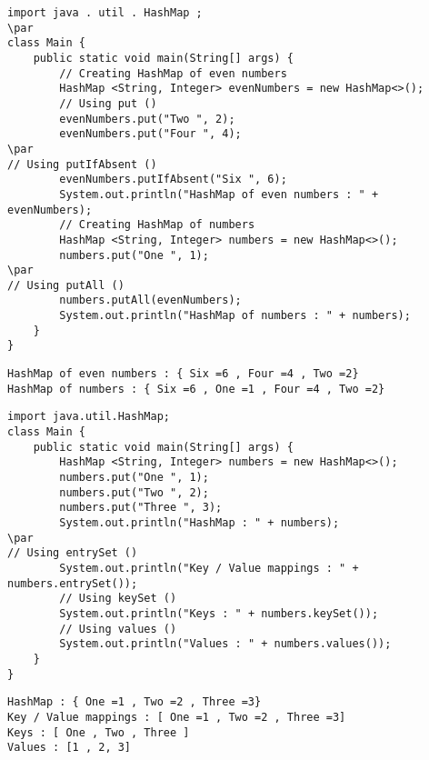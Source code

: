 \documentclass{book}
\def\lthtmlcheckvsize{\ifdim\ht\sizebox<\vsize 
  \ifdim\wd\sizebox<\hsize\expandafter\hfill\fi \expandafter\vfill
  \else\expandafter\vss\fi}%
\begin{document}
{\newpage\clearpage
{}%
\begin{lstlisting}
import java . util . HashMap ;
\par
class Main {
	public static void main(String[] args) {
		// Creating HashMap of even numbers
		HashMap <String, Integer> evenNumbers = new HashMap<>();
		// Using put ()
		evenNumbers.put("Two ", 2);
		evenNumbers.put("Four ", 4);
\par
// Using putIfAbsent ()
		evenNumbers.putIfAbsent("Six ", 6);
		System.out.println("HashMap of even numbers : " + evenNumbers);
		// Creating HashMap of numbers
		HashMap <String, Integer> numbers = new HashMap<>();
		numbers.put("One ", 1);
\par
// Using putAll ()
		numbers.putAll(evenNumbers);
		System.out.println("HashMap of numbers : " + numbers);
	}
}
\end{lstlisting}%
\lthtmlfigureZ
\lthtmlcheckvsize\clearpage}

{\newpage\clearpage
{}%
\begin{lstlisting}
HashMap of even numbers : { Six =6 , Four =4 , Two =2}
HashMap of numbers : { Six =6 , One =1 , Four =4 , Two =2}
\end{lstlisting}%
\lthtmlfigureZ
\lthtmlcheckvsize\clearpage}

{\newpage\clearpage
{}%
\begin{lstlisting}
import java.util.HashMap;
class Main {
	public static void main(String[] args) {
		HashMap <String, Integer> numbers = new HashMap<>();
		numbers.put("One ", 1);
		numbers.put("Two ", 2);
		numbers.put("Three ", 3);
		System.out.println("HashMap : " + numbers);
\par
// Using entrySet ()
		System.out.println("Key / Value mappings : " + numbers.entrySet());
		// Using keySet ()
		System.out.println("Keys : " + numbers.keySet());
		// Using values ()
		System.out.println("Values : " + numbers.values());
	}
}
\end{lstlisting}%
\lthtmlfigureZ
\lthtmlcheckvsize\clearpage}

{\newpage\clearpage
{}%
\begin{lstlisting}
HashMap : { One =1 , Two =2 , Three =3}
Key / Value mappings : [ One =1 , Two =2 , Three =3]
Keys : [ One , Two , Three ]
Values : [1 , 2, 3]
\end{lstlisting}%
\lthtmlfigureZ
\lthtmlcheckvsize\clearpage}
\end{document}
